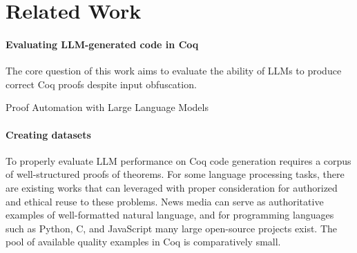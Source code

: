 
\section{Related Work}
\label{sec:related-work}

\paragraph{Evaluating LLM-generated code in Coq}

The core question of this work aims to evaluate
the ability of LLMs to produce correct Coq proofs
despite input obfuscation.

Proof Automation with Large Language Models\cite{proofautomationwithllms}



\paragraph
{Creating datasets}
To properly evaluate LLM performance on
Coq code generation requires a corpus of well-structured
proofs of theorems. For some language processing tasks,
there are existing works that can leveraged 
with proper consideration for authorized and ethical reuse
to these problems.
News media can serve as authoritative examples of
well-formatted natural language, and for programming
languages such as Python, C, and JavaScript many large
open-source projects exist.
The pool of available quality examples in Coq is
comparatively small. 



